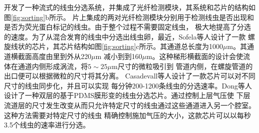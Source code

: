 	开发了一种流式的线虫分选系统，并集成了光纤检测模块，其系统和芯片的结构如图\ref{fig:sorting}b所示。
	片上集成的两对光纤检测模块分别用于检测线虫是否出现和是否为荧光蛋白标记的线虫。由于整个过程不需要固定线虫，
	极大地提高了分选的速度。为了从混合发育的线虫中分选出线虫卵，最近，Sofela等人\cite{sofela2018high}设计了一款
	螺旋线状的芯片，其芯片结构如图\ref{fig:sorting}c所示。其通道总长度为1000$\mu$m。其通道横截面高度由里到外从220$\mu$m
	减小到到160$\mu$m。这种梯形横截面的设计会使流体在通道内侧形成涡流，将$5\sim25\mu$m尺寸的微粒吸引到
	管道内侧，在螺旋管道的出口便可以根据微粒的尺寸将其分离。
	Casadevall\cite{Casadevall2011High}等人设计了一款芯片可以对不同尺寸的线虫同步化，并且可以实现
	每分钟200-1200条线虫的分选速率。Dong\cite{dong2016versatile}等人设计了一种双层的基于PDMS膜形变的线虫分选芯片。通过控制上层气压使
	下层流道层的尺寸发生改变从而只允许特定尺寸的线虫通过这些通道进入另一个腔室。这种方法需要对特定尺寸的线虫
	精确控制施加气压的大小，这款芯片可以以每秒3.5个线虫的速率进行分选。

